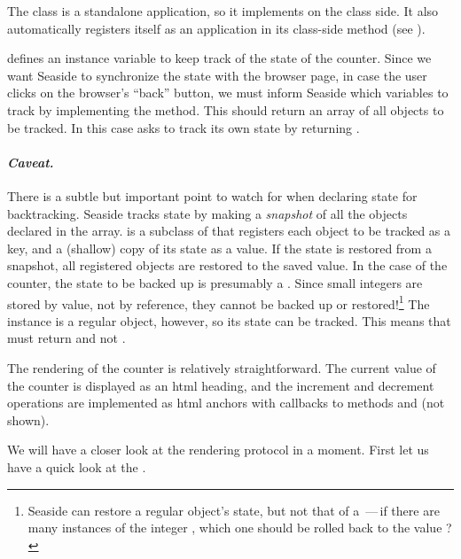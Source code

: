 \documentclass[a4paper,10pt,twoside]{book}
\begin{document}
The class  is a standalone application, so it implements  on the class side.
It also automatically registers itself as an application in its class-side  method (see ).

 defines an instance variable  to keep track of the state of the counter.
Since we want Seaside to synchronize the state with the browser page, \ie in case the user clicks on the browser's ``back'' button, we must inform Seaside which variables to track by implementing the  method.
This should return an array of all objects to be tracked.
In this case  asks to track its own state by returning .

\paragraph{\emph{Caveat.}}
There is a subtle but important point to watch for when declaring state for backtracking.
Seaside tracks state by making a \emph{snapshot} of all the objects declared in the  array.
 is a subclass of  that registers each object to be tracked as a key, and a (shallow) copy of its state as a value.
If the state is restored from a snapshot, all registered objects are restored to the saved value.
In the case of the counter, the state to be backed up is presumably a .
Since small integers are stored by value, not by reference, they cannot be backed up or restored!\footnote{Seaside can restore a regular object's state, but not that of a \,---\,if there are many instances of the integer , which one should be rolled back to the value ?}
The  instance is a regular object, however, so its state can be tracked.
This means that  must return  and not .

The rendering of the counter is relatively straightforward.
The current value of the counter is displayed as an html heading, and the increment and decrement operations are implemented as html anchors with callbacks to methods  and  (not shown).

We will have a closer look at the rendering protocol in a moment.
First let us have a quick look at the .
\end{document}
